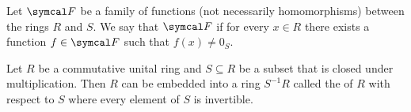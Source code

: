 \begin{definition}\label{def:functions_vanish_nowhere}
  Let \( \Cal{F} \) be a family of functions (not necessarily homomorphisms) between the rings \( R \) and \( S \). We say that \( \Cal{F} \)  if for every \( x \in R \) there exists a function \( f \in \Cal{F} \) such that \( f(x) \neq 0_S \).
\end{definition}

\begin{proposition}\label{def:ring_localization}\cite[428]{Knapp2016BAlg}
  Let \( R \) be a commutative unital ring and \( S \subseteq R \) be a subset that is closed under multiplication. Then \( R \) can be embedded into a ring \( S^{-1} R \) called the  of \( R \) with respect to \( S \) where every element of \( S \) is invertible.
\end{proposition}
